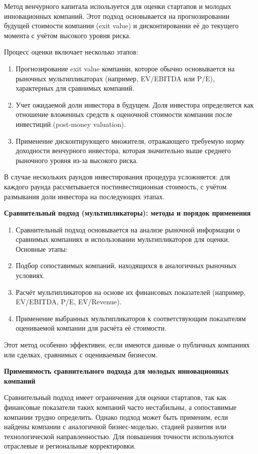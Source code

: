 Метод венчурного капитала используется для оценки стартапов и молодых инновационных компаний. Этот подход основывается на прогнозировании будущей стоимости компании (exit value) и дисконтировании её до текущего момента с учётом высокого уровня риска.

Процесс оценки включает несколько этапов:
\begin{enumerate}
    \item Прогнозирование exit value компании, которое обычно основывается на рыночных мультипликаторах (например, EV/EBITDA или P/E), характерных для сравнимых компаний.
    \item Учет ожидаемой доли инвестора в будущем. Доля инвестора определяется как отношение вложенных средств к оценочной стоимости компании после инвестиций (post-money valuation).
    \item Применение дисконтирующего множителя, отражающего требуемую норму доходности венчурного инвестора, которая значительно выше среднего рыночного уровня из-за высокого риска.
\end{enumerate}

В случае нескольких раундов инвестирования процедура усложняется: для каждого раунда рассчитывается постинвестиционная стоимость, с учётом размывания доли инвестора на последующих этапах.

\textbf{Сравнительный подход (мультипликаторы): методы и порядок применения}

\begin{enumerate}
    \item Сравнительный подход основывается на анализе рыночной информации о сравнимых компаниях и использовании мультипликаторов для оценки. Основные этапы:
    \item Подбор сопоставимых компаний, находящихся в аналогичных рыночных условиях.
    \item Расчёт мультипликаторов на основе их финансовых показателей (например, EV/EBITDA, P/E, EV/Revenue).
    \item Применение выбранных мультипликаторов к соответствующим показателям оцениваемой компании для расчёта её стоимости.
\end{enumerate}

Этот метод особенно эффективен, если имеются данные о публичных компаниях или сделках, сравнимых с оцениваемым бизнесом.

\textbf{Применимость сравнительного подхода для молодых инновационных компаний}

Сравнительный подход имеет ограничения для оценки стартапов, так как финансовые показатели таких компаний часто нестабильны, а сопоставимые компании трудно определить. Однако подход может быть применим, если найдены компании с аналогичной бизнес-моделью, стадией развития или технологической направленностью. Для повышения точности используются отраслевые и региональные корректировки.

\pagebreak